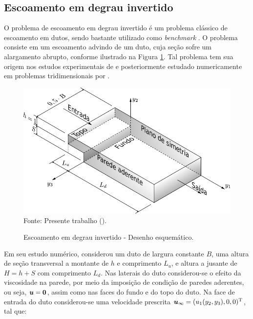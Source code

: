 \subsection{Escoamento em degrau invertido} \label{ex:backwardFacingStep}

O problema de escoamento em degrau invertido é um problema clássico de escoamento em dutos, sendo bastante utilizado como \textit{benchmark} \cite{armaly1983experimental,chiang1999numerical}. O problema consiste em um escoamento advindo de um duto, cuja seção sofre um alargamento abrupto, conforme ilustrado na Figura \ref{fig:step}. Tal problema tem sua origem nos estudos experimentais de  e posteriormente estudado numericamente em problemas tridimensionais por .

\begin{figure}[h!]
    \centering
    \caption{Escoamento em degrau invertido - Desenho esquemático.}
    \includegraphics[width=.7\linewidth]{Figuras/backwardFacingStep/backwardFacingStep.pdf}
    \\Fonte: Presente trabalho (\the\year).
    \label{fig:step}
\end{figure}

Em seu estudo numérico,  considerou um duto de largura constante $B$, uma altura de seção transversal a montante de $h$ e comprimento $L_u$, e altura a jusante de $H=h+S$ com comprimento $L_d$. Nas laterais do duto considerou-se o efeito da viscosidade na parede, por meio da imposição de condição de paredes aderentes, ou seja, $\boldsymbol{u}=\boldsymbol{0}$, assim como nas faces do fundo e do topo do duto. Na face de entrada do duto considerou-se uma velocidade prescrita $\boldsymbol{u}_\infty=(u_1(y_2,y_3),0,0)^\mathrm{T}$, tal que:

